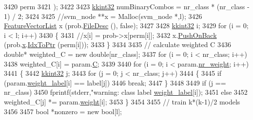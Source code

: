\begin{DoxyCode}
3420                        perm
3421                       );
3422 
3423     \hyperlink{namespace_k_k_b_a8fa4952cc84fda1de4bec1fbdd8d5b1b}{kkint32}  numBinaryCombos = nr\_class * (nr\_class - 1) / 2;
3424 
3425     \textcolor{comment}{//svm\_node **x = Malloc(svm\_node *,l);}
3426     \hyperlink{class_k_k_m_l_l_1_1_feature_vector_list}{FeatureVectorList} x (prob.\hyperlink{struct_s_v_m289___m_f_s_1_1svm__problem_a4b0a7bee7be16b685372bc6d2cfcda8d}{FileDesc} (), \textcolor{keyword}{false});
3427 
3428     \hyperlink{namespace_k_k_b_a8fa4952cc84fda1de4bec1fbdd8d5b1b}{kkint32} i;
3429     \textcolor{keywordflow}{for}  (i = 0;  i < l;  i++)
3430     \{
3431       \textcolor{comment}{//x[i] = prob->x[perm[i]];}
3432       x.\hyperlink{class_k_k_m_l_l_1_1_feature_vector_list_abd43779a90a6aa3db1de8092be877bdb}{PushOnBack} (prob.\hyperlink{struct_s_v_m289___m_f_s_1_1svm__problem_a7bca932b51ca89f6820225e8e9c1bd35}{x}.\hyperlink{class_k_k_b_1_1_k_k_queue_acce2bdd8b3327e38266cf198382cd852}{IdxToPtr} (perm[i]));
3433     \}
3434 
3435     \textcolor{comment}{// calculate weighted C}
3436     \textcolor{keywordtype}{double}*  weighted\_C = \textcolor{keyword}{new} \textcolor{keywordtype}{double}[nr\_class];
3437     \textcolor{keywordflow}{for}  (i = 0;  i < nr\_class;  i++)
3438       weighted\_C[i] = param.\hyperlink{struct_s_v_m289___m_f_s_1_1svm__parameter_aac66b1e8a16d4076bfe8b45e82bd8e7a}{C};
3439 
3440     for  (i = 0;  i < param.\hyperlink{struct_s_v_m289___m_f_s_1_1svm__parameter_a7c87bf61e72f27b04efe132672b432a1}{nr\_weight};  i++)
3441     \{  
3442       \hyperlink{namespace_k_k_b_a8fa4952cc84fda1de4bec1fbdd8d5b1b}{kkint32} j;
3443       \textcolor{keywordflow}{for}  (j = 0;  j < nr\_class;  j++)
3444       \{
3445         \textcolor{keywordflow}{if}  (param.\hyperlink{struct_s_v_m289___m_f_s_1_1svm__parameter_a729c98939a2e1a5859fcad70bbabf063}{weight\_label}[i] == label[j])
3446           \textcolor{keywordflow}{break};
3447       \}
3448 
3449       \textcolor{keywordflow}{if}  (j == nr\_class)
3450         fprintf(stderr,\textcolor{stringliteral}{"warning: class label %
      \hyperlink{struct_s_v_m289___m_f_s_1_1svm__parameter_a729c98939a2e1a5859fcad70bbabf063}{weight\_label}[i]);
3451       \textcolor{keywordflow}{else}
3452         weighted\_C[j] *= param.\hyperlink{struct_s_v_m289___m_f_s_1_1svm__parameter_a6d64cad82215930bd3f55b3c3ef7c543}{weight}[i];
3453     \}
3454 
3455     \textcolor{comment}{// train k*(k-1)/2 models}
3456     
3457     \textcolor{keywordtype}{bool} *nonzero = \textcolor{keyword}{new} \textcolor{keywordtype}{bool}[l];
}
\end{DoxyCode}
